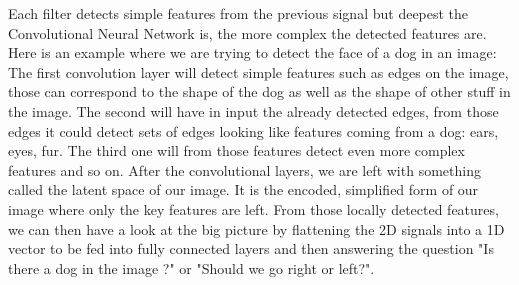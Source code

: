 \documentclass[12pt]{article}
\begin{document}
Each filter detects simple features from the previous signal but deepest the Convolutional Neural Network is, the more complex the detected features are. Here is an example where we are trying to detect the face of a dog in an image: 
The first convolution layer will detect simple features such as edges on the image, those can correspond to the shape of the dog as well as the shape of other stuff in the image. The second will have in input the already detected edges, from those edges it could detect sets of edges looking like features coming from a dog: ears, eyes, fur. The third one will from those features detect even more complex features and so on.
After the convolutional layers, we are left with something called the latent space of our image. It is the encoded, simplified form of our image where only the key features are left. From those locally detected features, we can then have a look at the big picture by flattening the 2D signals into a 1D vector to be fed into fully connected layers and then answering the question "Is there a dog in the image ?" or "Should we go right or left?". \\

\newpage
\end{document}
